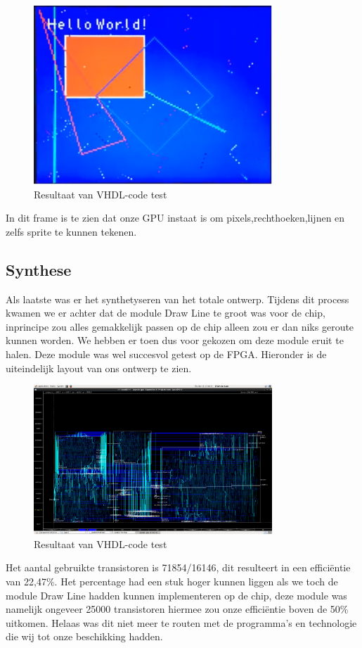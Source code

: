\documentclass{scrartcl} %
\begin{document}
\begin{figure}[H]
	\centering
	\includegraphics[width=0.8\textwidth]{FPGAtest}
	\caption{Resultaat van VHDL-code test}
\end{figure}

In dit frame is te zien dat onze GPU instaat is om pixels,rechthoeken,lijnen en zelfs sprite te kunnen tekenen.


\subsection{Synthese}

Als laatste was er het synthetyseren van het totale ontwerp. Tijdens dit process kwamen we er achter dat de module Draw Line te groot was voor de chip, inprincipe zou alles gemakkelijk passen op de chip alleen zou er dan niks geroute kunnen worden. We hebben er toen dus voor gekozen om deze module eruit te halen. Deze module was wel succesvol getest op de FPGA. Hieronder is de uiteindelijk layout van ons ontwerp te zien.


\begin{figure}[H]
	\centering
	\includegraphics[width=0.8\textwidth]{layout}
	\caption{Resultaat van VHDL-code test}
\end{figure}

Het aantal gebruikte transistoren is 71854/16146, dit resulteert in een efficiëntie van 22,47\%. Het percentage had een stuk hoger kunnen liggen als we toch de module Draw Line hadden kunnen implementeren op de chip, deze module was namelijk ongeveer 25000 transistoren hiermee zou onze efficiëntie boven de 50\% uitkomen. Helaas was dit niet meer te routen met de programma's en technologie die wij tot onze beschikking hadden.
\end{document}
